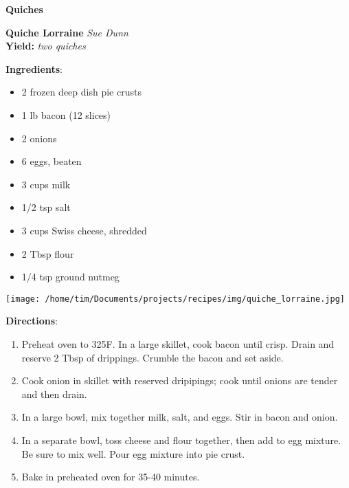 \documentclass[11pt, twoside, openany]{book}
\begin{document}
{\newpage \LARGE \textbf{Quiches}} \label{quiches}\vspace{4mm}\\
\noindent\begin{minipage}[t]{\linewidth}%
{\Large\textbf{Quiche Lorraine}} \label{quiche-lorraine}\hfill\textit{Sue Dunn}\\
\textbf{Yield:} \textit{two quiches}\\
\noindent\begin{minipage}[t]{0.78\linewidth}%
\textbf{Ingredients}:\vspace{-3mm}
\begin{multicols}{2}
\begin{itemize}\setlength\itemsep{-1mm}
\item 2 frozen deep dish pie crusts
\item 1 lb bacon (12 slices)
\item 2 onions
\item 6 eggs, beaten
\item 3 cups milk
\item 1/2 tsp salt
\item 3 cups Swiss cheese, shredded
\item 2 Tbsp flour
\item 1/4 tsp ground nutmeg
\end{itemize}
\end{multicols}
\end{minipage}
\noindent\begin{minipage}[t]{0.18\linewidth}
\centering \strut\vspace*{-\baselineskip}\newline
\texttt{[image: /home/tim/Documents/projects/recipes/img/quiche\_lorraine.jpg]}\\
\end{minipage}\vspace{3mm}
\textbf{Directions}:
\vspace{-3mm}\begin{enumerate}\setlength\itemsep{-1mm}
\item Preheat oven to 325F. In a large skillet, cook bacon until crisp. Drain and reserve 2 Tbsp of drippings. Crumble the bacon and set aside.
\item Cook onion in skillet with reserved dripipings; cook until onions are tender and then drain.
\item In a large bowl, mix together milk, salt, and eggs. Stir in bacon and onion.
\item In a separate bowl, toss cheese and flour together, then add to egg mixture. Be sure to mix well. Pour egg mixture into pie crust.
\item Bake in preheated oven for 35-40 minutes.
\end{enumerate}
\end{minipage}\vspace{8mm}
\end{document}
